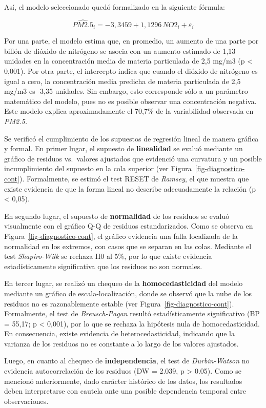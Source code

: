 \documentclass[
  spanish,
  letterpaper,
  DIV=11,
  numbers=noendperiod]{scrartcl}
\begin{document}
Así, el modelo seleccionado quedó formalizado en la siguiente fórmula:

\[
\widehat{PM2.5}_{i}
= -3{,}3459 + 1{,}1296\,NO2_{i} + \varepsilon_i
\]

Por una parte, el modelo estima que, en promedio, un aumento de una
parte por billón de dióxido de nitrógeno se asocia con un aumento
estimado de 1,13 unidades en la concentración media de materia
particulada de 2,5 mg/m3 (p \textless{} 0,001). Por otra parte, el
intercepto indica que cuando el dióxido de nitrógeno es igual a cero, la
concentración media predicha de materia particulada de 2,5 mg/m3 es
-3,35 unidades. Sin embargo, esto corresponde sólo a un parámetro
matemático del modelo, pues no es posible observar una concentración
negativa. Este modelo explica aproximadamente el 70,7\% de la
variabilidad observada en \emph{PM2.5.}

Se verificó el cumplimiento de los supuestos de regresión lineal de
manera gráfica y formal. En primer lugar, el supuesto de
\textbf{linealidad} se evaluó mediante un gráfico de residuos
vs.~valores ajustados que evidenció una curvatura y un posible
incumplimiento del supuesto en la cola superior (ver
Figura~\ref{fig-diagnostico-cont}). Formalmente, se estimó el test RESET
de \emph{Ramsey}, el que muestra que existe evidencia de que la forma
lineal no describe adecuadamente la relación (p \textless{} 0,05).

En segundo lugar, el supuesto de \textbf{normalidad} de los residuos se
evaluó visualmente con el gráfico Q-Q de residuos estandarizados. Como
se observa en Figura~\ref{fig-diagnostico-cont}, el gráfico evidencia
una falla localizada de la normalidad en los extremos, con casos que se
separan en las colas. Mediante el test \emph{Shapiro-Wilk} se rechaza H0
al 5\%, por lo que existe evidencia estadísticamente significativa que
los residuos no son normales.

En tercer lugar, se realizó un chequeo de la \textbf{homocedasticidad}
del modelo mediante un gráfico de escala-localización, donde se observó
que la nube de los residuos no es razonablemente estable (ver
Figura~\ref{fig-diagnostico-cont}). Formalmente, el test de
\emph{Breusch-Pagan} resultó estadísticamente significativo (BP = 55,17;
p \textless{} 0,001), por lo que se rechaza la hipótesis nula de
homocedasticidad. En consecuencia, existe evidencia de
heterocedasticidad, indicando que la varianza de los residuos no es
constante a lo largo de los valores ajustados.

Luego, en cuanto al chequeo de \textbf{independencia}, el test de
\emph{Durbin-Watson} no evidencia autocorrelación de los residuos (DW =
2.039, p \textgreater{} 0.05). Como se mencionó anteriormente, dado
carácter histórico de los datos, los resultados deben interpretarse con
cautela ante una posible dependencia temporal entre observaciones.
\end{document}
